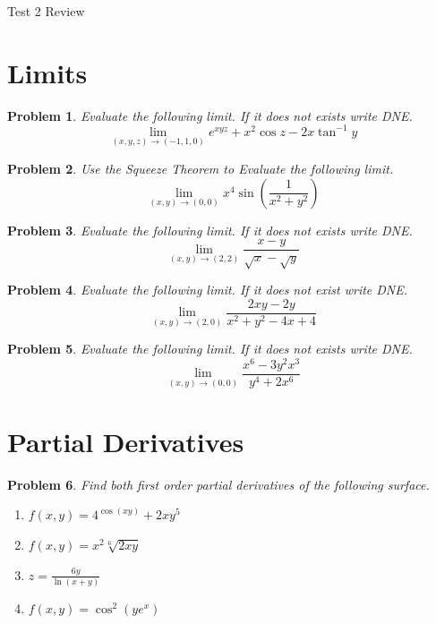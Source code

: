 \documentclass[11pt]{article}
\newtheorem{problem}{Problem}
\newcommand{\vs}{\vspace*{.1in}}
\begin{document}
\begin{huge}
    \begin{center}
        Test 2 Review
    \end{center}
\end{huge}


\vs\vs

\section{Limits}

\begin{problem}
Evaluate the following limit. If it does not exists write DNE. \[\lim_{(x,y,z) \to (-1,1,0)} e^{xyz}+x^2\cos{z}-2x\tan^{-1}{y}\]
\end{problem}

\begin{problem}
 Use the Squeeze Theorem to Evaluate the following limit. \[\lim_{(x,y) \to (0,0)} x^4\sin\left(\frac{1}{x^2+y^2}\right)\]   
\end{problem}

\begin{problem}
Evaluate the following limit. If it does not exists write DNE. \[\lim_{(x,y) \to (2,2)} \frac{x-y}{\sqrt{x}-\sqrt{y}}\]
\end{problem}

\begin{problem}
    Evaluate the following limit. If it does not exist write DNE. \[\lim_{(x,y)\to (2,0)} \frac{2xy-2y}{x^2+y^2-4x+4}\]
\end{problem}

\begin{problem}
Evaluate the following limit. If it does not exists write DNE. \[\lim_{(x,y) \to (0,0)} \frac{x^6-3y^2x^3}{y^4+2x^6}\]
\end{problem}


\section{Partial Derivatives}

\begin{problem}
Find both first order partial derivatives of the following surface.
\begin{enumerate}
    \item $f(x,y) = 4^{\cos(xy)}+2xy^5$
    \item $f(x,y) = x^2\sqrt[6]{2xy}$
    \item $z = \frac{6y}{\ln{(x+y)}}$
    \item $f(x,y) = \cos^2{(ye^{x})}$
\end{enumerate}
\end{problem}
\end{document}
